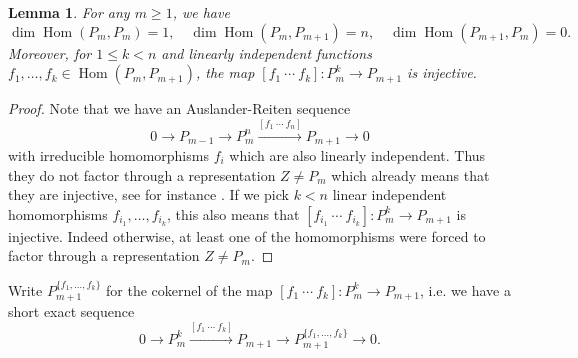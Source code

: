 \documentclass{amsart}
\newtheorem{lemma}[theorem]{Lemma}
\newcommand{\Hom}{\operatorname{Hom}}
\begin{document}
\begin{lemma}
  For any $m\ge1$, we have 
  \[\dim\Hom(P_m,P_m)=1,\quad \dim\Hom(P_m,P_{m+1})=n,\quad \dim\Hom(P_{m+1},P_m)=0.\]  
  Moreover, for $1\le k<n$ and linearly independent functions $f_1,\ldots,f_k\in\Hom(P_m,P_{m+1})$, the map $[f_1\ \cdots\ f_k]:P_m^k\to P_{m+1}$ is injective. 
\end{lemma}
\begin{proof} 
  Note that we have an Auslander-Reiten sequence
  \begin{equation}
  \label{eq:AR sequence}
    0\longrightarrow P_{m-1}\longrightarrow P_m^n\stackrel{[f_1\ \cdots\ f_n]}{\longrightarrow} P_{m+1}\longrightarrow 0
  \end{equation}
  with irreducible homomorphisms $f_i$ which are also linearly independent. 
  Thus they do not factor through a representation $Z\neq P_{m}$ which already means that they are injective, see for instance \cite[Lemma 1.6]{ass}. 
  If we pick $k<n$ linear independent homomorphisms $f_{i_1},\ldots, f_{i_k}$, this also means that $[f_{i_1}\ \cdots\ f_{i_k}]:P_m^k\to P_{m+1}$ is injective. 
  Indeed otherwise, at least one of the homomorphisms were forced to factor through a representation $Z\neq P_{m}$.
\end{proof}

Write $P_{m+1}^{\{f_1,\ldots,f_k\}}$ for the cokernel of the map $[f_1\ \cdots\ f_k]:P_m^k\to P_{m+1}$, i.e. we have a short exact sequence
\begin{equation}
\label{eq:truncated preprojectives}
  0\longrightarrow P_m^k\stackrel{[f_1\ \cdots\ f_k]}{\longrightarrow} P_{m+1}\longrightarrow P_{m+1}^{\{f_1,\ldots,f_k\}}\longrightarrow 0.
\end{equation}
\end{document}
